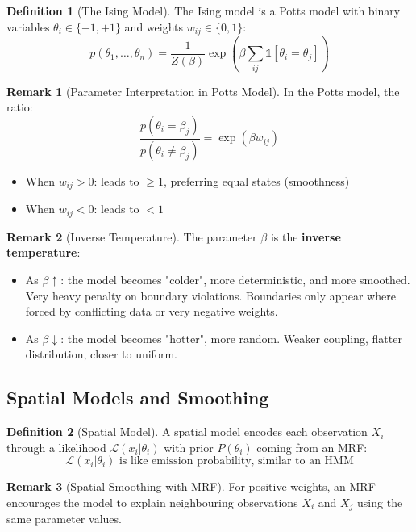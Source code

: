 \documentclass[12pt,a4paper]{article}
\theoremstyle{definition}
\newtheorem{definition}{Definition}[section]
\newtheorem{remark}{Remark}[section]
\begin{document}
\begin{definition}[The Ising Model]
The Ising model is a Potts model with binary variables $\theta_i \in \{-1, +1\}$ and weights $w_{ij} \in \{0, 1\}$:
\[
p(\theta_1, \ldots, \theta_n) = \frac{1}{Z(\beta)} \exp\left(\beta \sum_{ij} \mathbb{1}[\theta_i = \theta_j]\right)
\]
\end{definition}

\begin{remark}[Parameter Interpretation in Potts Model]
In the Potts model, the ratio:
\[
\frac{p(\theta_i = \beta_j)}{p(\theta_i \neq \beta_j)} = \exp(\beta w_{ij})
\]
\begin{itemize}
    \item When $w_{ij} > 0$: leads to $\geq 1$, preferring equal states (smoothness)
    \item When $w_{ij} < 0$: leads to $< 1$
\end{itemize}
\end{remark}

\begin{remark}[Inverse Temperature]
The parameter $\beta$ is the \textbf{inverse temperature}:
\begin{itemize}
    \item As $\beta \uparrow$: the model becomes "colder", more deterministic, and more smoothed. Very heavy penalty on boundary violations. Boundaries only appear where forced by conflicting data or very negative weights.
    \item As $\beta \downarrow$: the model becomes "hotter", more random. Weaker coupling, flatter distribution, closer to uniform.
\end{itemize}
\end{remark}

\subsection{Spatial Models and Smoothing}

\begin{definition}[Spatial Model]
A spatial model encodes each observation $X_i$ through a likelihood $\mathcal{L}(x_i|\theta_i)$ with prior $P(\theta_i)$ coming from an MRF:
\[
\mathcal{L}(x_i|\theta_i) \text{ is like emission probability, similar to an HMM}
\]
\end{definition}

\begin{remark}[Spatial Smoothing with MRF]
For positive weights, an MRF encourages the model to explain neighbouring observations $X_i$ and $X_j$ using the same parameter values.
\end{remark}
\end{document}
